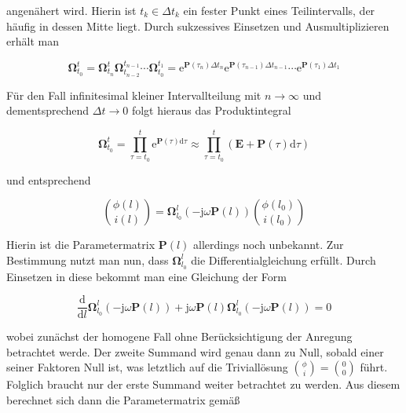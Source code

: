 angenähert wird. Hierin ist $t_{k} \in \Delta t_{k}$ ein fester Punkt eines Teilintervalls, der häufig in dessen Mitte liegt. Durch sukzessives Einsetzen und Ausmultiplizieren erhält man


\begin{equation}
	\boldsymbol{\Omega}_{t_{0}}^{t}=\boldsymbol{\Omega}_{t_{n}}^{t} \boldsymbol{\Omega}_{t_{n-2}}^{t_{n-1}} \cdots \boldsymbol{\Omega}_{t_{0}}^{t_{1}}=\mathrm{e}^{\mathbf{P}\left(\tau_{n}\right) \Delta t_{n}} \mathrm{e}^{\mathbf{P}\left(\tau_{n-1}\right) \Delta t_{n-1}} \cdots \mathrm{e}^{\mathbf{P}\left(\tau_{1}\right) \Delta t_{1}} 
\end{equation}


Für den Fall infinitesimal kleiner Intervallteilung mit $n \rightarrow \infty$ und dementsprechend $\Delta t \rightarrow 0$ folgt hieraus das Produktintegral


\begin{equation}
	\boldsymbol{\Omega}_{t_{0}}^{t}=\prod_{\tau=t_{0}}^{t} \mathrm{e}^{\mathbf{P}(\tau) \mathrm{d} \tau} \approx \prod_{\tau=t_{0}}^{t}(\mathbf{E}+\mathbf{P}(\tau) \mathrm{d} \tau) 
\end{equation}


und entsprechend


\begin{equation}
	\binom{\phi(l)}{i(l)}=\boldsymbol{\Omega}_{l_{0}}^{l}(-\mathrm{j} \omega \mathbf{P}(l))\binom{\phi\left(l_{0}\right)}{i\left(l_{0}\right)} 
\end{equation}


Hierin ist die Parametermatrix $\mathbf{P}(l)$ allerdings noch unbekannt. Zur Bestimmung nutzt man nun, dass $\boldsymbol{\Omega}_{l_{0}}^{l}$ die Differentialgleichung erfüllt. Durch Einsetzen in diese bekommt man eine Gleichung der Form


\begin{equation}
	\frac{\mathrm{d}}{\mathrm{d} l} \boldsymbol{\Omega}_{l_{0}}^{l}(-\mathrm{j} \omega \mathbf{P}(l))+\mathrm{j} \omega \mathbf{P}(l) \boldsymbol{\Omega}_{l_{0}}^{l}(-\mathrm{j} \omega \mathbf{P}(l))=0 
\end{equation}


wobei zunächst der homogene Fall ohne Berücksichtigung der Anregung betrachtet werde. Der zweite Summand wird genau dann zu Null, sobald einer seiner Faktoren Null ist, was letztlich auf die Triviallösung $\binom{\phi}{i}=\binom{0}{0}$ führt. Folglich braucht nur der erste Summand weiter betrachtet zu werden. Aus diesem berechnet sich dann die Parametermatrix gemäß


